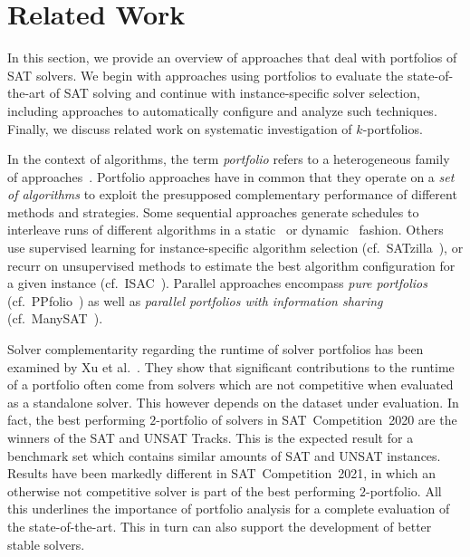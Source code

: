 \documentclass[a4paper,USenglish,pdfa]{lipics-v2021} %
\begin{document}
\section{Related Work}
\label{sec:related-work}

In this section, we provide an overview of approaches that deal with portfolios of SAT solvers. 
We begin with approaches using portfolios to evaluate the state-of-the-art of SAT solving and continue with instance-specific solver selection, including approaches to automatically configure and analyze such techniques. 
Finally, we discuss related work on systematic investigation of $k$-portfolios.

In the context of algorithms, the term \emph{portfolio} refers to a heterogeneous family of approaches~\cite{kerschke2019automated}. 
Portfolio approaches have in common that they operate on a \emph{set of algorithms} to exploit the presupposed complementary performance of different methods and strategies. 
Some sequential approaches generate schedules to interleave runs of different algorithms in a static~\cite{Gomes:2001:AlgoSched} or dynamic~\cite{Carchrae:2005:AlgoSched,Streeter:2007:AlgoSched} fashion. 
Others use supervised learning for instance-specific algorithm selection (cf.~SATzilla~\cite{xu2008satzilla}), or recurr on unsupervised methods to estimate the best algorithm configuration for a given instance (cf.~ISAC~\cite{Kadioglu:2010:ISAC}).
Parallel approaches encompass \emph{pure portfolios} (cf.~PPfolio~\cite{Roussel:2012:ppfolio}) as well as \emph{parallel portfolios with information sharing} (cf.~ManySAT~\cite{Hamadi:2009:ManySAT}).

Solver complementarity regarding the runtime of solver portfolios has been examined by Xu et al.~\cite{Xu:2012:EvalContribVBS}. 
They show that significant contributions to the runtime of a portfolio often come from solvers which are not competitive when evaluated as a standalone solver. 
This however depends on the dataset under evaluation. 
In fact, the best performing $2$-portfolio of solvers in SAT~Competition~2020 are the winners of the SAT and UNSAT Tracks.
This is the expected result for a benchmark set which contains similar amounts of SAT and UNSAT instances. 
Results have been markedly different in SAT~Competition~2021, in which an otherwise not competitive solver is part of the best performing $2$-portfolio. 
All this underlines the importance of portfolio analysis for a complete evaluation of the state-of-the-art. 
This in turn can also support the development of better stable solvers.
\end{document}
